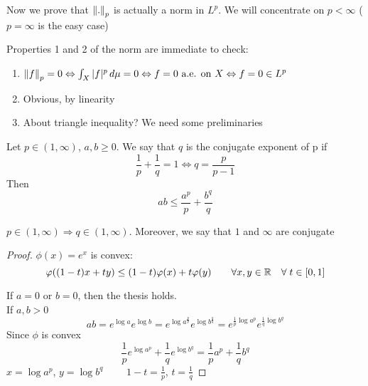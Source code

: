Now we prove that \(\norm{.}_p\) is actually a norm in \(L^p\). 
We will concentrate on \(p < \infty\) (\(p = \infty\) is the easy case) 

Properties 1 and 2 of the norm are immediate to check:
\begin{enumerate}
    \item \(\norm{f}_p = 0 \Leftrightarrow \int_X |f|^p \, d\mu =0 \Leftrightarrow f=0 \text{ a.e. on } X \Leftrightarrow f=0 \in L^p\)
    \item Obvious, by linearity
    \item About triangle inequality? We need some preliminaries
\end{enumerate}

\begin{theorem}
    Let \(p \in (1, \infty)\), \(a, b \geq 0\). We say that \(q\) is the conjugate exponent of p if 
    \[
        \frac{1}{p} + \frac{1}{q} = 1 \Leftrightarrow q = \frac{p}{p-1}
    \]
    Then 
    \[
        ab \leq \frac{a^p}{p} + \frac{b^q}{q}
    \]
\end{theorem}
\begin{remark}
    \(p \in (1, \infty) \Rightarrow q \in (1, \infty)\). Moreover, we say that \(1\) and \(\infty\) are conjugate
\end{remark}
\begin{proof}
    \(\phi(x)= e^{x}\) is convex: 
    \[
        \varphi((1-t)x + ty) \leq (1-t)\varphi(x) + t \varphi(y) \qquad \forall x, y \in \mathbb{R} \quad \forall \; t \in [0, 1]
    \]

    If \(a=0\) or \(b=0\), then the thesis holds. \\
    If \(a, b >0\)
    \[
        ab = e^{\log{a}} e^{\log{b}}
        = e^{\log{a}^{\frac{p}{p}}} e^{\log{b}^{\frac{q}{q}}}
        = e^{\frac{1}{p}\log{a}^p} e^{\frac{1}{q}\log{b}^q}
    \]
    Since \(\phi \) is convex
    \[
        \frac{1}{p} e^{\log{a}^p} + \frac{1}{q} e^{\log{b}^q} = \frac{1}{p} a^p + \frac{1}{q} b^q
    \]
    \(x = \log{a^p}\), \(y= \log{b^q}\) \(\qquad 1-t = \frac{1}{p}\), \(t=\frac{1}{q}\)
\end{proof}

